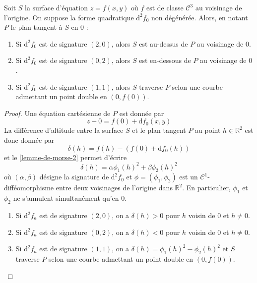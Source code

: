
  \begin{application}
    Soit $S$ la surface d'équation $z = f(x, y)$ où $f$ est de classe $\mathcal{C}^3$ au voisinage de l'origine. On suppose la forme quadratique $\mathrm{d}^2 f_0$ non dégénérée. Alors, en notant $P$ le plan tangent à $S$ en $0$ :
    \begin{enumerate}[label={\bfseries(\roman*)}]
      \item Si $\mathrm{d}^2 f_0$ est de signature $(2, 0)$, alors $S$ est au-dessus de $P$ au voisinage de $0$.
      \item Si $\mathrm{d}^2 f_0$ est de signature $(0, 2)$, alors $S$ est en-dessous de $P$ au voisinage de $0$.
      \item Si $\mathrm{d}^2 f_0$ est de signature $(1, 1)$, alors $S$ traverse $P$ selon une courbe admettant un point double en $(0, f(0))$.
    \end{enumerate}
  \end{application}

  \begin{proof}
    Une équation cartésienne de $P$ est donnée par
    \[ z - 0 = f(0) + \mathrm{d} f_0(x, y) \]
    La différence d'altitude entre la surface $S$ et le plan tangent $P$ au point $h \in \mathbb{R}^2$ est donc donnée par
    \[ \delta(h) = f(h) - (f(0) + \mathrm{d}f_0(h)) \]
    et le \cref{lemme-de-morse-2} permet d'écrire
    \[ \delta(h) = \alpha \phi_1(h)^2 + \beta \phi_2(h)^2 \]
    où $(\alpha, \beta)$ désigne la signature de $\mathrm{d}^2 f_0$ et $\phi = (\phi_1, \phi_2)$ est un $\mathcal{C}^1$-difféomorphisme entre deux voisinages de l'origine dans $\mathbb{R}^2$. En particulier, $\phi_1$ et $\phi_2$ ne s'annulent simultanément qu'en $0$.
    \begin{enumerate}[label={\bfseries(\roman*)}]
      \item Si $\mathrm{d}^2 f_a$ est de signature $(2, 0)$, on a $\delta(h) > 0$ pour $h$ voisin de $0$ et $h \neq 0$.
      \item Si $\mathrm{d}^2 f_a$ est de signature $(0, 2)$, on a $\delta(h) < 0$ pour $h$ voisin de $0$ et $h \neq 0$.
      \item Si $\mathrm{d}^2 f_a$ est de signature $(1, 1)$, on a $\delta(h) = \phi_1(h)^2 - \phi_2(h)^2$ et $S$ traverse $P$ selon une courbe admettant un point double en $(0, f(0))$.
    \end{enumerate}
  \end{proof}

